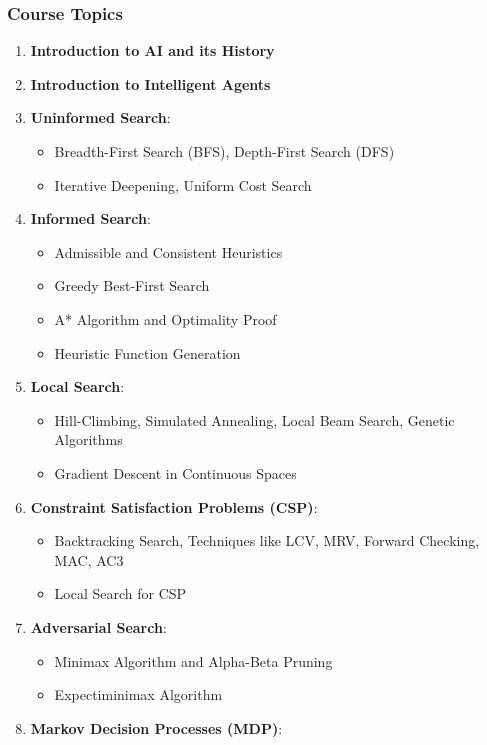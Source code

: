 \documentclass[12pt]{article}
\begin{document}
\subsubsection*{Course Topics}
\begin{enumerate}
    \item \textbf{Introduction to AI and its History}
    \item \textbf{Introduction to Intelligent Agents}
    \item \textbf{Uninformed Search}:
    \begin{itemize}
        \item Breadth-First Search (BFS), Depth-First Search (DFS)
        \item Iterative Deepening, Uniform Cost Search
    \end{itemize}
    \item \textbf{Informed Search}:
    \begin{itemize}
        \item Admissible and Consistent Heuristics
        \item Greedy Best-First Search
        \item A* Algorithm and Optimality Proof
        \item Heuristic Function Generation
    \end{itemize}
    \item \textbf{Local Search}:
    \begin{itemize}
        \item Hill-Climbing, Simulated Annealing, Local Beam Search, Genetic Algorithms
        \item Gradient Descent in Continuous Spaces
    \end{itemize}
    \item \textbf{Constraint Satisfaction Problems (CSP)}:
    \begin{itemize}
        \item Backtracking Search, Techniques like LCV, MRV, Forward Checking, MAC, AC3
        \item Local Search for CSP
    \end{itemize}
    \item \textbf{Adversarial Search}:
    \begin{itemize}
        \item Minimax Algorithm and Alpha-Beta Pruning
        \item Expectiminimax Algorithm
    \end{itemize}
    \item \textbf{Markov Decision Processes (MDP)}:

\end{enumerate}
\end{document}
